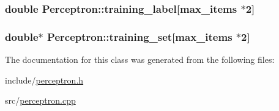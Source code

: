 \subsubsection[{training\+\_\+label}]{\setlength{\rightskip}{0pt plus 5cm}double Perceptron\+::training\+\_\+label\mbox{[}{\bf max\+\_\+items} $\ast$2\mbox{]}}\hypertarget{classPerceptron_a7b395bb8dd492268fc2324c275b8ca4c}{}\label{classPerceptron_a7b395bb8dd492268fc2324c275b8ca4c}
\subsubsection[{training\+\_\+set}]{\setlength{\rightskip}{0pt plus 5cm}double$\ast$ Perceptron\+::training\+\_\+set\mbox{[}{\bf max\+\_\+items} $\ast$2\mbox{]}}\hypertarget{classPerceptron_af93816c52b31be423764b53c22733a01}{}\label{classPerceptron_af93816c52b31be423764b53c22733a01}


The documentation for this class was generated from the following files\+:\begin{DoxyCompactItemize}
\item 
include/\hyperlink{perceptron_8h}{perceptron.\+h}\item 
src/\hyperlink{perceptron_8cpp}{perceptron.\+cpp}\end{DoxyCompactItemize}
